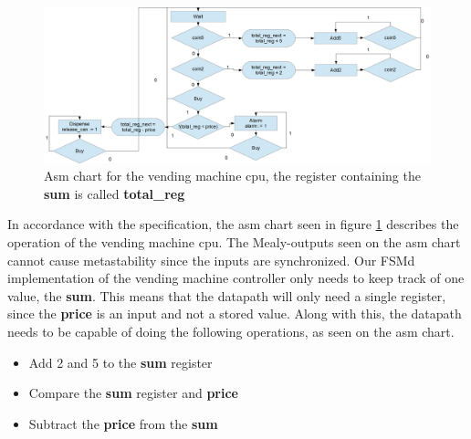 \begin{figure}
    \center
    \includegraphics[scale=0.3]{pictures/cola_asm.png}
    \caption{Asm chart for the vending machine cpu, the register containing the \textbf{sum} is called \textbf{total\_reg}}
    \label{cola_asm}
\end{figure}
In accordance with the specification, the asm chart seen in figure \ref{cola_asm}
describes the operation of the vending machine cpu. The Mealy-outputs seen on the asm chart cannot cause metastability since the inputs are synchronized.
Our FSMd implementation of the vending machine controller only needs to keep track of one value, the \textbf{sum}.
This means that the datapath will only need a single register, since the \textbf{price} is an input and not a stored value.
Along with this, the datapath needs to be capable of doing the following operations, as seen on the asm chart.
\begin{itemize}
    \item Add 2 and 5 to the \textbf{sum} register
    \item Compare the \textbf{sum} register and \textbf{price}
    \item Subtract the \textbf{price} from the \textbf{sum}
\end{itemize}
